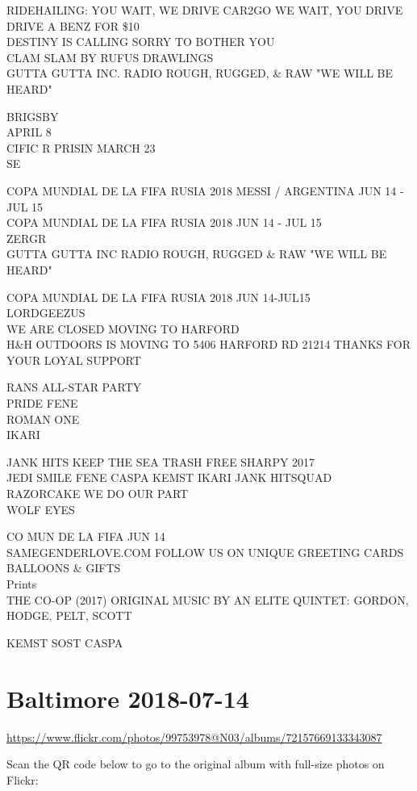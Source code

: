 \documentclass[10pt,letterpaper]{article}
\begin{document}
RIDEHAILING: YOU WAIT, WE DRIVE CAR2GO WE WAIT, YOU DRIVE DRIVE A BENZ FOR \$10\\
DESTINY IS CALLING SORRY TO BOTHER YOU\\
CLAM SLAM BY RUFUS DRAWLINGS\\
GUTTA GUTTA INC. RADIO ROUGH, RUGGED, \& RAW "WE WILL BE HEARD"

BRIGSBY\\
APRIL 8\\
CIFIC R PRISIN MARCH 23\\
SE

COPA MUNDIAL DE LA FIFA RUSIA 2018 MESSI / ARGENTINA JUN 14 {-} JUL 15\\
COPA MUNDIAL DE LA FIFA RUSIA 2018 JUN 14 {-} JUL 15\\
ZERGR\\
GUTTA GUTTA INC RADIO ROUGH, RUGGED \& RAW "WE WILL BE HEARD"

COPA MUNDIAL DE LA FIFA RUSIA 2018 JUN 14{-}JUL15\\
LORDGEEZUS\\
WE ARE CLOSED MOVING TO HARFORD\\
H\&H OUTDOORS IS MOVING TO 5406 HARFORD RD 21214 THANKS FOR YOUR LOYAL SUPPORT

RANS ALL{-}STAR PARTY\\
PRIDE FENE\\
ROMAN ONE\\
IKARI

JANK HITS KEEP THE SEA TRASH FREE SHARPY 2017\\
JEDI SMILE FENE CASPA KEMST IKARI JANK HITSQUAD\\
RAZORCAKE WE DO OUR PART\\
WOLF EYES

CO MUN DE LA FIFA JUN 14\\
SAMEGENDERLOVE.COM FOLLOW US ON UNIQUE GREETING CARDS BALLOONS \& GIFTS\\
Prints\\
THE CO{-}OP (2017) ORIGINAL MUSIC BY AN ELITE QUINTET: GORDON, HODGE, PELT, SCOTT

KEMST SOST CASPA


\section*{Baltimore 2018-07-14}

\url{https://www.flickr.com/photos/99753978@N03/albums/72157669133343087}

Scan the QR code below to go to the original album with full-size photos on Flickr:
\end{document}

